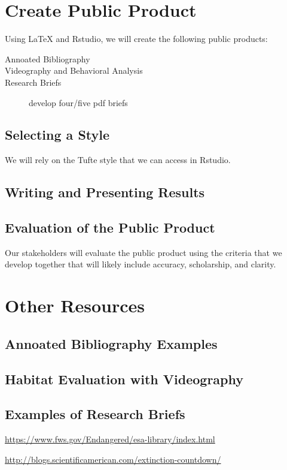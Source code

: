 \documentclass{tufte-handout}\usepackage[]{graphicx}\usepackage[]{color}
\begin{document}
\section{Create Public Product}

Using LaTeX and Rstudio, we will create the following public products: 

\begin{description}
  \item[Annoated Bibliography]
  \item[Videography and Behavioral Analysis]
  \item[Research Briefs] develop four/five pdf briefs
\end{description}

\subsection{Selecting a Style}

We will rely on the Tufte style that we can access in Rstudio. 

\subsection{Writing and Presenting Results}


\subsection{Evaluation of the Public Product}

Our stakeholders will evaluate the public product using the criteria that we develop together that will likely include accuracy, scholarship, and clarity. 

\section{Other Resources}

\subsection{Annoated Bibliography Examples}

\subsection{Habitat Evaluation with Videography}

\subsection{Examples of Research Briefs}

\href{https://www.fws.gov/Endangered/esa-library/index.html}{https://www.fws.gov/Endangered/esa-library/index.html}

\href{http://blogs.scientificamerican.com/extinction-countdown/}{http://blogs.scientificamerican.com/extinction-countdown/}
\end{document}

